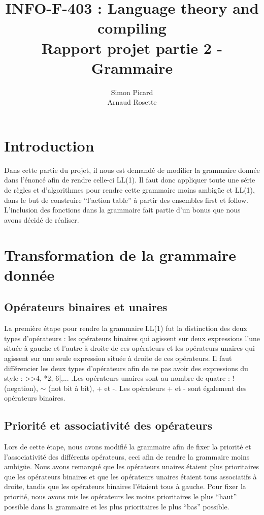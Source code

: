\documentclass[a4paper,10pt]{article}
\title{INFO-F-403 : Language theory and compiling \\ Rapport projet partie 2 - Grammaire}
\author{Simon Picard \\ Arnaud Rosette}
\begin{document}
\maketitle

\section{Introduction}
Dans cette partie du projet, il nous est demandé de modifier la grammaire donnée dans l'énoncé afin de rendre celle-ci LL(1). Il faut donc appliquer toute une série de règles et d'algorithmes pour rendre cette grammaire moins ambigüe et LL(1), dans le but de construire ``l'action table'' à partir des ensembles first et follow. L'inclusion des fonctions dans la grammaire fait partie d'un bonus que nous avons décidé de réaliser.

\section{Transformation de la grammaire donnée}
\subsection{Opérateurs binaires et unaires}
La première étape pour rendre la grammaire LL(1) fut la distinction des deux types d'opérateurs : les opérateurs binaires qui agissent sur deux expressions l'une située à gauche et l'autre à droite de ces opérateurs et les opérateurs unaires qui agissent sur une seule expression située à droite de ces opérateurs. Il faut différencier les deux types d'opérateurs afin de ne pas avoir des expressions du style : >>4, *2, 6|,... .Les opérateurs unaires sont au nombre de quatre : ! (negation), $\sim$ (not bit à bit), + et -. Les opérateurs + et - sont également des opérateurs binaires. 
\subsection{Priorité et associativité des opérateurs}
Lors de cette étape, nous avons modifié la grammaire afin de fixer la priorité et l'associativité des différents opérateurs, ceci afin de rendre la grammaire moins ambigüe. Nous avons remarqué que les opérateurs unaires étaient plus prioritaires que les opérateurs binaires et que les opérateurs unaires étaient tous associatifs à droite, tandis que les opérateurs binaires l'étaient tous à gauche. Pour fixer la priorité, nous avons mis les opérateurs les moins prioritaires le plus ``haut'' possible dans la grammaire et les plus prioritaires le plus ``bas'' possible. 
\end{document}

